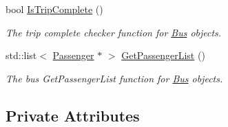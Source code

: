 \begin{DoxyCompactItemize}
bool \hyperlink{classBus_a9c64b0801bf589f121fb0598b70a99b4}{Is\+Trip\+Complete} ()
\begin{DoxyCompactList}\small\item\em The trip complete checker function for \hyperlink{classBus}{Bus} objects. \end{DoxyCompactList}\item 
std\+::list$<$ \hyperlink{classPassenger}{Passenger} $\ast$ $>$ \hyperlink{classBus_a0662511d51f1c4ba7466e626be3c2ca0}{Get\+Passenger\+List} ()
\begin{DoxyCompactList}\small\item\em The bus Get\+Passenger\+List function for \hyperlink{classBus}{Bus} objects. \end{DoxyCompactList}\end{DoxyCompactItemize}
\subsection*{Private Attributes}
